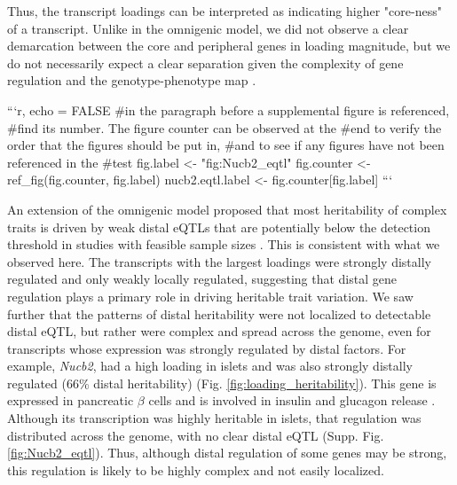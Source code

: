 Thus, the transcript loadings can be interpreted as indicating higher 
"core-ness" of a transcript. Unlike in the omnigenic model, we did not
observe a clear demarcation between the core and peripheral genes in 
loading magnitude, but we do not necessarily expect a clear separation 
given the complexity of gene regulation and the genotype-phenotype map 
\cite{pmid29906445}.

```{r, echo = FALSE}
#in the paragraph before a supplemental figure is referenced,
#find its number. The figure counter can be observed at the 
#end to verify the order that the figures should be put in,
#and to see if any figures have not been referenced in the 
#test
fig.label <- "fig:Nucb2_eqtl"
fig.counter <- ref_fig(fig.counter, fig.label)
nucb2.eqtl.label <- fig.counter[fig.label]
```

An extension of the omnigenic model proposed that most heritability
of complex traits is driven by weak distal eQTLs that are potentially
below the detection threshold in studies with feasible sample sizes 
\cite{pmid31051098}. This is consistent with what we observed here. 
The transcripts with the largest loadings were strongly distally 
regulated and only weakly locally regulated, suggesting that 
distal gene regulation plays a primary role in driving heritable 
trait variation. We saw further that the patterns of distal 
heritability were not localized to detectable distal eQTL, but 
rather were complex and spread across the genome, even for 
transcripts whose expression was strongly regulated by distal 
factors. For example, \textit{Nucb2}, had a high loading in islets 
and was also strongly distally regulated (66\% distal heritability) (Fig. 
\ref{fig:loading_heritability}). This gene is expressed in pancreatic 
$\beta$ cells and is involved in insulin and glucagon release 
\cite{pmid22108805, pmid23537085, pmid24993278}. Although its 
transcription was highly heritable in islets, that regulation was 
distributed across the genome, with no clear distal eQTL 
(Supp. Fig. \ref{fig:Nucb2_eqtl}). Thus, although distal regulation 
of some genes may be strong, this regulation is likely to be highly 
complex and not easily localized. 

